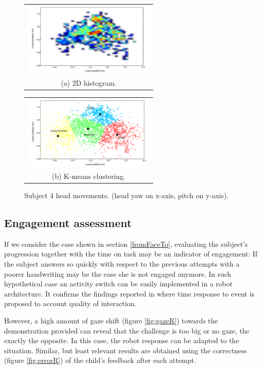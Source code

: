 \documentclass{sig-alternate}
\begin{document}
\begin{figure}
  \centering
  \begin{tabular}{@{}c@{}}
    \includegraphics[width=.7\linewidth,height=100pt]{heatmap} \\
    \small (a)  2D histogram.
  \end{tabular}

  \vspace{\floatsep}

  \begin{tabular}{@{}c@{}}
    \includegraphics[width=.7\linewidth,height=100pt]{kmeans} \\
    \small (b) K-means clustering.
  \end{tabular}

  \caption{ \small Subject 4 head movements. (head yaw on x-axis, pitch on y-axis).}
  \label{fig:heatmap}
\end{figure}

\subsection{Engagement assessment}
If we consider the case shown in section \ref{fromFaceTo}, evaluating the subject's progression together with the time on task may be an indicator of engagement: If the subject answers so quickly with respect to the previous attempts with a poorer handwriting may be the case she is not engaged anymore. In such hypothetical case an activity switch can be easily implemented in a robot architecture. It confirms the findings reported in \cite{anzalone} where time response to event is proposed to account quality of interaction. 
        
However, a high amount of gaze shift (figure \ref{fig:gazeR}) towards the demonstration provided can reveal that the challenge is too big or no gaze, the exactly the opposite. In this case, the robot response can be adapted to the situation. Similar, but least relevant results are obtained using the correctness (figure \ref{fig:errorR}) of the child's feedback after each attempt. 
\end{document}

